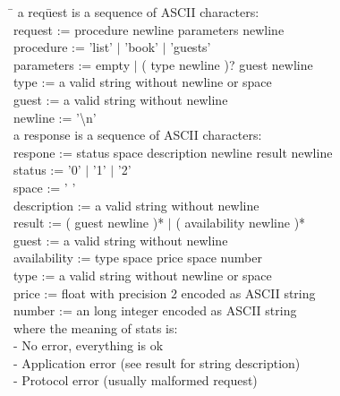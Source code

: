 \documentclass[a4paper,10pt]{article}
\begin{document}
\begin{tabbing}
\hspace{20pt}\=\kill
 \> a req\=uest is a sequence of ASCII characters: \+\\ 
 \> request := procedure newline parameters newline\\
 \> procedure := 'list' $\vert$ 'book' $\vert$ 'guests'\\
 \> parameters := empty $\vert$ ( type newline )? guest newline\\
 \> type := a valid string without newline or space\\ 
 \> guest := a valid string without newline\\
 \> newline := '\textbackslash n' \-\\ 
 \> a response is a sequence of ASCII characters:\+ \\
 \> respone := status space description newline result newline \\
 \> status := '0' $\vert$ '1' $\vert$ '2'\\
 \> space := ' '\\
 \> description := a valid string without newline\\
 \> result := ( guest newline )* $\vert$ ( availability newline )*\\
 \> guest := a valid string without newline\\
 \> availability := type space price space number\\
 \> type := a valid string without newline or space\\
 \> price := float with precision 2 encoded as ASCII string\\
 \> number := an long integer encoded as ASCII string \-\\
 \> where the meaning of stats is: \+\\
  - No error, everything is ok\\
  - Application error (see result for string description)\\
  - Protocol error (usually malformed request)\\
\end{tabbing}
\end{document}
